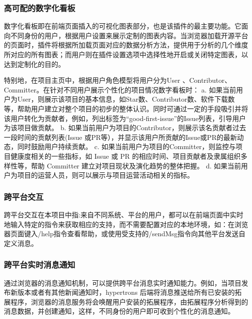 \subsubsection{高可配的数字化看板}
\par 数字化看板即在前端页面插入的可视化图表部分，也是该插件的最主要功能。它面向不同身份的用户，根据用户设置来展示定制的图表内容。当浏览器加载开源平台的页面时，插件将根据所加载页面对应的数据分析方法，提供用于分析的几个维度所对应的所有图表；而用户则在插件设置选项中选择性地开启或关闭特定图表，以达到定制化的目的。

\par 特别地，在项目主页中，根据用户角色模型将用户分为User 、Contributor、Committer。在针对不同用户展示个性化的项目情况数字看板时\cite{廖志芳2019github开源软件开发过程中关键用户行为分析}：
a.	如果当前用户为User，则展示该项目的基本信息，如Star数、Contributor数、软件下载数等，帮助用户建立对整个项目的初步的整体认识。同时可通过一定的手段吸引并将该用户转化为贡献者，例如，列出标签为“good-first-issue”的Issue列表，引导用户为该项目做贡献。
b.	如果当前用户为项目的Contributor，则展示该名贡献者过去一段时间的贡献列表(Issue 或PR等），并显示该用户所贡献的Issue或PR的最新动态，同时鼓励用户持续贡献。
c.	如果当前用户为项目的Committer，则监控与项目健康度相关的一些指标，如 Issue 或 PR 的相应时间、项目贡献者及隶属组织多样性等，帮助 Committer 建立对项目现状及演化趋势的整体把握。
d.	如果当前用户为项目的运营人员，则可以展示与项目运营活动相关的指标。


\subsubsection{跨平台交互}
\par 跨平台交互在本项目中指:来自不同系统、平台的用户，都可以在前端页面中实时地输入特定的指令来获取相应的支持，而不需要配置对应的本地环境，如：在浏览器页面键入/help指令查看帮助，或使用受支持的/sendMsg指令向其他平台发送自定义消息\cite{朱亚琼2016可视化驱动的交互式数据挖掘方法研究}。

\subsubsection{跨平台实时消息通知}
\par 通过浏览器的消息通知机制，可以提供跨平台消息实时通知能力。例如，当项目发布新版本或者有其他新闻通知时，hypertrons 后端将消息推送给所有已安装的拓展程序，浏览器的消息服务将会唤醒用户安装的拓展程序，由拓展程序分析得到的消息数据，并创建通知，这样，不同身份的用户即可收到个性化的消息通知。


